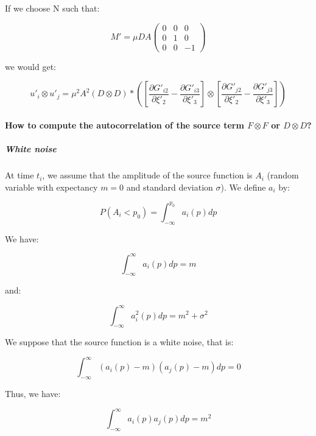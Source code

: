 \documentclass[workdone.tex]{subfiles}
\begin{document}
If we choose N such that:

\begin{equation}
M' = \mu D A \begin{pmatrix}
0 & 0 & 0 \\
0 & 1 & 0 \\
0 & 0 & -1
\end{pmatrix}
\end{equation}

we would get:

\begin{equation}
u'_i \otimes u'_j = \mu^2 A^2 (D \otimes D) * ([\frac{\partial G'_{i2}}{\partial \xi'_2} - \frac{\partial G'_{i3}}{\partial \xi'_3}] \otimes [\frac{\partial G'_{j2}}{\partial \xi'_2} - \frac{\partial G'_{j3}}{\partial \xi'_3}])
\end{equation}

\paragraph{How to compute the autocorrelation of the source term $F \otimes F$ or $D \otimes D$?}

\subparagraph{White noise}

At time $t_i$, we assume that the amplitude of the source function is $A_i$ (random variable with expectancy $m = 0$ and standard deviation $\sigma$). We define $a_i$ by:

\begin{equation}
P (A_i < p_0) = \int_{- \infty}^{p_0} a_i (p) dp
\end{equation}

We have:

\begin{equation}
\int_{- \infty}^{\infty} a_i (p) dp = m
\end{equation}

and:

\begin{equation}
\int_{- \infty}^{\infty} a_i^2 (p) dp = m^2 + \sigma ^2
\end{equation}

We suppose that the source function is a white noise, that is:

\begin{equation}
\int_{- \infty}^{\infty} (a_i (p) - m) (a_j (p) - m) dp = 0
\end{equation}

Thus, we have:

\begin{equation}
\int_{- \infty}^{\infty} a_i (p) a_j (p) dp = m^2
\end{equation}
\end{document}
